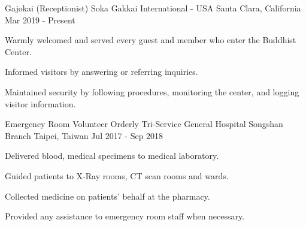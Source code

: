 

\begin{cventries}

  \cventry
    {Gajokai (Receptionist)} %
    {Soka Gakkai International - USA} %
    {Santa Clara, California} %
    {Mar 2019 - Present} %
    {
	\begin{cvitems} %
      	\item Warmly welcomed and served every guest and member who enter the Buddhist Center.
      	\item Informed visitors by answering or referring inquiries.
      	\item Maintained security by following procedures, monitoring the center, and logging visitor information.
	\end{cvitems}
    }
    
  \cventry
    {Emergency Room Volunteer Orderly} %
    {Tri-Service General Hospital Songshan Branch} %
    {Taipei, Taiwan} %
    {Jul 2017 - Sep 2018} %
    {
	\begin{cvitems} %
      	\item Delivered blood, medical specimens to medical laboratory.
		\item Guided patients to X-Ray rooms, CT scan rooms and wards.       
      	\item Collected medicine on patients' behalf at the pharmacy.
      	\item Provided any assistance to emergency room staff when necessary.
	\end{cvitems}
    }


\end{cventries}
